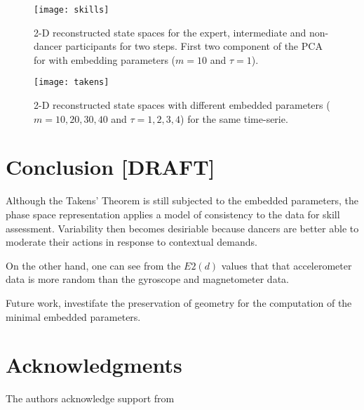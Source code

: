 \documentclass{sigchi}
\begin{document}
  
  \begin{figure}[htbp!] 
  \centering    
  \texttt{[image: skills]}
  \caption[PA]{2-D reconstructed state spaces for the expert, intermediate and 
  non-dancer participants for two steps. First two component of the PCA
  for with embedding parameters ($m = 10$ and $\tau = 1$).}
  \label{fig:skills}
  \end{figure}


\begin{figure}[htbp!] 
\centering    
\texttt{[image: takens]}
\caption[PA]{2-D reconstructed state spaces with different embedded parameters ($m=10,20,30,40$ and $\tau= 1,2,3,4$)
for the same time-serie.}
\label{fig:takens}
\end{figure}



 \section{Conclusion [DRAFT]}
Although the Takens' Theorem is still subjected to the embedded parameters,
the phase space representation applies a model of consistency to the data for skill assessment.
Variability then becomes desiriable because dancers are better able  
to moderate their actions in response to contextual demands.

On the other hand, one can see from the $E2(d)$ values that that accelerometer data 
is more random than the gyroscope and magnetometer data.


 



Future work, investifate the preservation of geometry \cite{Yap2014} 
for the computation of the minimal embedded parameters.


\section{Acknowledgments}
The authors acknowledge support from 
\end{document}

